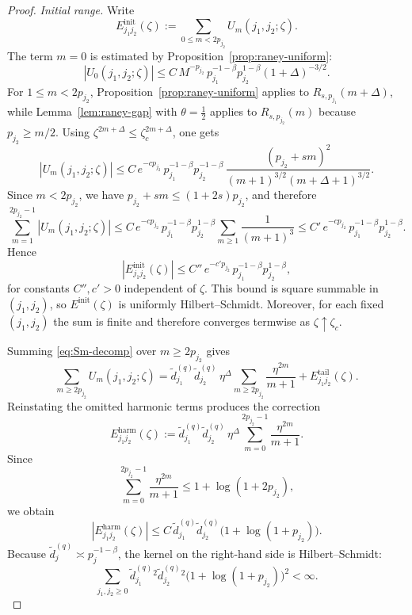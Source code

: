 \documentclass[11pt]{amsart}
\numberwithin{equation}{section}
\theoremstyle{plain}
\theoremstyle{definition}
\theoremstyle{remark}
\begin{document}
\begin{proof}
	\smallskip
	\noindent\emph{Initial range.}
	Write
	\[
		E^{\mathrm{init}}_{j_1j_2}(\zeta):=\sum_{0\le m<2p_{j_2}}U_m(j_1,j_2;\zeta).
	\]
	The term \(m=0\) is estimated by Proposition~\ref{prop:raney-uniform}:
	\[
		|U_0(j_1,j_2;\zeta)|
		\le
		C\,M^{-p_{j_2}}\,p_{j_1}^{-1-\beta}p_{j_2}^{1-\beta}(1+\Delta)^{-3/2}.
	\]
	For \(1\le m<2p_{j_2}\), Proposition~\ref{prop:raney-uniform} applies to
	\(R_{s,p_{j_1}}(m+\Delta)\), while Lemma~\ref{lem:raney-gap} with
	\(\theta=\frac12\) applies to \(R_{s,p_{j_2}}(m)\) because
	\(p_{j_2}\ge m/2\).  Using \(\zeta^{2m+\Delta}\le \zeta_c^{2m+\Delta}\), one gets
	\[
		|U_m(j_1,j_2;\zeta)|
		\le
		C\,e^{-c p_{j_2}}\,
		p_{j_1}^{-1-\beta}p_{j_2}^{-1-\beta}\,
		\frac{(p_{j_2}+sm)^2}{(m+1)^{3/2}(m+\Delta+1)^{3/2}}.
	\]
	Since \(m<2p_{j_2}\), we have \(p_{j_2}+sm\le (1+2s)p_{j_2}\), and therefore
	\[
		\sum_{m=1}^{2p_{j_2}-1}|U_m(j_1,j_2;\zeta)|
		\le
		C\,e^{-c p_{j_2}}\,
		p_{j_1}^{-1-\beta}p_{j_2}^{1-\beta}
		\sum_{m\ge1}\frac{1}{(m+1)^3}
		\le
		C'\,e^{-c p_{j_2}}\,p_{j_1}^{-1-\beta}p_{j_2}^{1-\beta}.
	\]
	Hence
	\[
		|E^{\mathrm{init}}_{j_1j_2}(\zeta)|
		\le
		C''\,e^{-c' p_{j_2}}\,p_{j_1}^{-1-\beta}p_{j_2}^{1-\beta},
	\]
	for constants \(C'',c'>0\) independent of \(\zeta\).  This bound is square
	summable in \((j_1,j_2)\), so \(E^{\mathrm{init}}(\zeta)\) is uniformly
	Hilbert--Schmidt.  Moreover, for each fixed \((j_1,j_2)\) the sum is finite and
	therefore converges termwise as \(\zeta\uparrow\zeta_c\).

	Summing \eqref{eq:Sm-decomp} over \(m\ge2p_{j_2}\) gives
	\[
		\sum_{m\ge2p_{j_2}}
		U_m(j_1,j_2;\zeta)
		=
		\widetilde d^{(q)}_{j_1}\widetilde d^{(q)}_{j_2}\,\eta^\Delta
		\sum_{m\ge2p_{j_2}}\frac{\eta^{2m}}{m+1}
		+
		E^{\mathrm{tail}}_{j_1j_2}(\zeta).
	\]
	Reinstating the omitted harmonic terms produces the correction
	\[
		E^{\mathrm{harm}}_{j_1j_2}(\zeta)
		:=
		\widetilde d^{(q)}_{j_1}\widetilde d^{(q)}_{j_2}\,\eta^\Delta
		\sum_{m=0}^{2p_{j_2}-1}\frac{\eta^{2m}}{m+1}.
	\]
	Since
	\[
		\sum_{m=0}^{2p_{j_2}-1}\frac{\eta^{2m}}{m+1}
		\le
		1+\log(1+2p_{j_2}),
	\]
	we obtain
	\[
		|E^{\mathrm{harm}}_{j_1j_2}(\zeta)|
		\le
		C\,\widetilde d^{(q)}_{j_1}\widetilde d^{(q)}_{j_2}\bigl(1+\log(1+p_{j_2})\bigr).
	\]
	Because \(\widetilde d^{(q)}_j\asymp p_j^{-1-\beta}\), the kernel on the
	right-hand side is Hilbert--Schmidt:
	\[
		\sum_{j_1,j_2\ge0}
		\widetilde d^{(q)}_{j_1}{}^2\widetilde d^{(q)}_{j_2}{}^2
		\bigl(1+\log(1+p_{j_2})\bigr)^2
		<\infty.
	\]


\end{proof}
\end{document}

